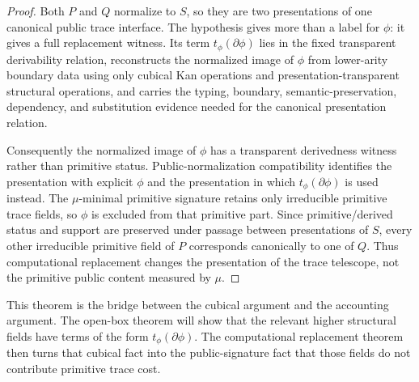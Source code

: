 \documentclass{lmcs}
\begin{document}
\begin{proof}
Both \(P\) and \(Q\) normalize to \(S\), so they are two presentations of one canonical public
trace interface.  The hypothesis gives more than a label for \(\phi\): it gives a full
replacement witness.  Its term \(t_\phi(\partial\phi)\) lies in the fixed transparent
derivability relation, reconstructs the normalized image of \(\phi\) from lower-arity
boundary data using only cubical Kan operations and presentation-transparent structural
operations, and carries the typing, boundary, semantic-preservation, dependency, and
substitution evidence needed for the canonical presentation relation.

Consequently the normalized image of \(\phi\) has a transparent derivedness witness rather
than primitive status.  Public-normalization compatibility identifies the presentation with explicit
\(\phi\) and the presentation in which \(t_\phi(\partial\phi)\) is used instead.  The
\(\mu\)-minimal primitive signature retains only irreducible primitive trace fields, so
\(\phi\) is excluded from that primitive part.  Since primitive/derived status and support are
preserved under passage between presentations of \(S\), every other irreducible primitive
field of \(P\) corresponds canonically to one of \(Q\).  Thus computational replacement
changes the presentation of the trace telescope, not the primitive public content measured
by \(\mu\).
\end{proof}

This theorem is the bridge between the cubical argument and the accounting argument.  The
open-box theorem will show that the relevant higher structural fields have terms of the form
\(t_\phi(\partial\phi)\).  The computational replacement theorem then turns that cubical fact
into the public-signature fact that those fields do not contribute primitive trace cost.
\end{document}

